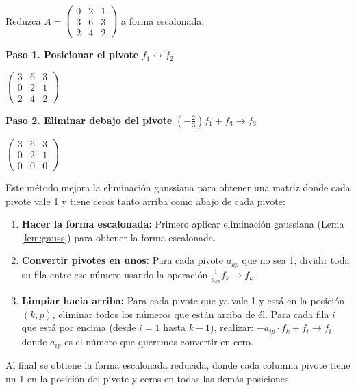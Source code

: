 \begin{example}
Reduzca $A = \begin{pmatrix} 0 & 2 & 1 \\ 3 & 6 & 3 \\ 2 & 4 & 2 \end{pmatrix}$ a forma escalonada.
\begin{myproof}
\textbf{Paso 1. Posicionar el pivote} $f_1 \leftrightarrow f_2$

$\begin{pmatrix} \boxed{3} & 6 & 3 \\ 0 & 2 & 1 \\ 2 & 4 & 2 \end{pmatrix}$

\textbf{Paso 2. Eliminar debajo del pivote} $\left(-\tfrac{2}{3}\right)f_1 + f_3 \to f_3$

$\boxed{\begin{pmatrix} 3 & 6 & 3 \\ 0 & \boxed{2} & 1 \\ 0 & 0 & 0 \end{pmatrix}}$
\end{myproof}
\end{example}

\begin{lemma}\label{lem:gauss-jordan}
Este método mejora la eliminación gaussiana para obtener una matriz donde cada pivote vale 1 y tiene ceros tanto arriba como abajo de cada pivote:

\begin{enumerate}
    \item \textbf{Hacer la forma escalonada:} Primero aplicar eliminación gaussiana (Lema \ref{lem:gauss}) para obtener la forma escalonada.
    
    \item \textbf{Convertir pivotes en unos:} Para cada pivote $a_{kp}$ que no sea 1, dividir toda su fila entre ese número usando la operación $\frac{1}{a_{kp}}f_k \to f_k$.
    
    \item \textbf{Limpiar hacia arriba:} Para cada pivote que ya vale 1 y está en la posición $(k,p)$, eliminar todos los números que están arriba de él. Para cada fila $i$ que está por encima (desde $i = 1$ hasta $k-1$), realizar:
    \( - a_{ip} \cdot f_k + f_i\to f_i
    \) donde $a_{ip}$ es el número que queremos convertir en cero.
\end{enumerate}

Al final se obtiene la forma escalonada reducida, donde cada columna pivote tiene un 1 en la posición del pivote y ceros en todas las demás posiciones.
\end{lemma}

